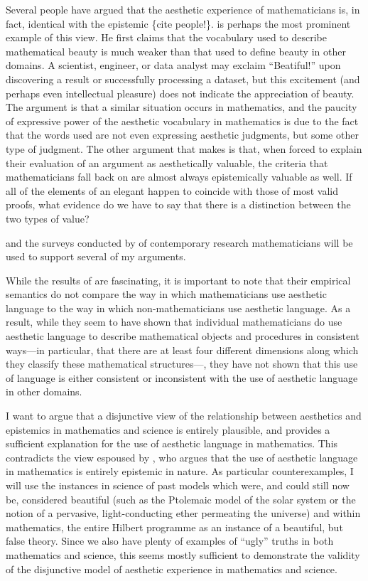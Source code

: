 \documentclass[a4paper,man,natbib]{apa6}
\begin{document}
Several people have argued that the aesthetic experience of mathematicians is, in fact, identical with the epistemic
 \{cite people!\}.
\cite{todd_unmasking_2008} is perhaps the most prominent example of this view. He first claims that the vocabulary used to
describe mathematical beauty is much weaker than that used to define beauty in other domains. A scientist, engineer,
or data analyst may exclaim ``Beatiful!'' upon discovering a result or successfully processing a dataset, but this
excitement (and perhaps even intellectual pleasure) does not indicate the appreciation of beauty. The argument is that
a similar situation occurs in mathematics, and the paucity of expressive power of the aesthetic vocabulary in mathematics
is due to the fact that the words used are not even expressing aesthetic judgments, but some other type of judgment. The
other argument that \cite{todd_unmasking_2008} makes is that, when forced to explain their evaluation of an argument
as aesthetically valuable, the criteria that mathematicians fall back on are almost always epistemically valuable as well.
If all of the elements of an elegant happen to coincide with those of most valid proofs, what evidence do we have to say
that there is a distinction between the two types of value?



and the surveys
conducted by \cite{inglis_beauty_2015} of contemporary research mathematicians will be used to support several
of my arguments. 

While the results of \cite{inglis_beauty_2015} are fascinating, it is important to note that their empirical
semantics do not compare the way in which mathematicians use aesthetic language to the way in which non-mathematicians
use aesthetic language. As a result, while they seem to have shown that individual mathematicians do use aesthetic
language to describe mathematical objects and procedures in consistent ways---in particular, that there are
at least four different dimensions along which they classify these mathematical structures---, they have not shown that this use
of language is either consistent or inconsistent with the use of aesthetic language in other domains. 


I want to argue that a disjunctive view of the relationship between aesthetics and epistemics in mathematics
and science is entirely plausible, and provides a sufficient explanation for the use of aesthetic language
in mathematics. This contradicts the view espoused by \cite{todd_unmasking_2008}, who argues that the
use of aesthetic language in mathematics is entirely epistemic in nature. As particular counterexamples,
I will use the instances in science of past models which were, and could still now be, considered beautiful (such
as the Ptolemaic model of the solar system or the notion of a pervasive, light-conducting ether permeating the
universe) and within mathematics, the entire Hilbert programme as an instance of a beautiful, but false theory.
Since we also have plenty of examples of ``ugly'' truths in both mathematics and science, this seems mostly sufficient
to demonstrate the validity of the disjunctive model of aesthetic experience in mathematics and science.
\end{document}
